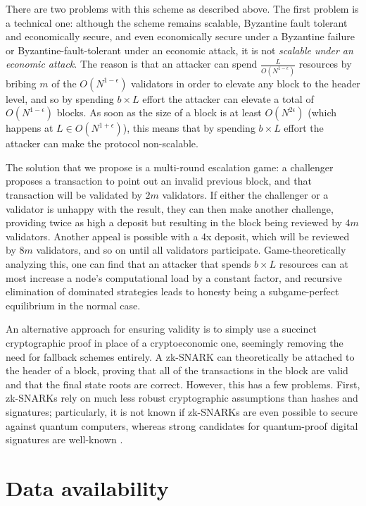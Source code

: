 \documentclass[11pt,a4paper]{report}
\theoremstyle{plain}
\theoremstyle{definition}
\theoremstyle{remark}
\begin{document}
There are two problems with this scheme as described above. The first problem is a technical one: although the scheme remains scalable, Byzantine fault tolerant and economically secure, and even economically secure under a Byzantine failure or Byzantine-fault-tolerant under an economic attack, it is not \emph{scalable under an economic attack}. The reason is that an attacker can spend $\frac{L}{O(N^{1-\epsilon})}$ resources by bribing $m$ of the $O(N^{1-\epsilon})$ validators in order to elevate any block to the header level, and so by spending $b \times  L$ effort the attacker can elevate a total of $O(N^{1-\epsilon})$ blocks. As soon as the size of a block is at least $O(N^{2\epsilon})$ (which happens at $L \in O(N^{1+\epsilon})$), this means that by spending $b \times  L$ effort the attacker can make the protocol non-scalable.

The solution that we propose is a multi-round escalation game: a challenger proposes a transaction to point out an invalid previous block, and that transaction will be validated by $2m$ validators. If either the challenger or a validator is unhappy with the result, they can then make another challenge, providing twice as high a deposit but resulting in the block being reviewed by $4m$ validators. Another appeal is possible with a 4x deposit, which will be reviewed by $8m$ validators, and so on until all validators participate. Game-theoretically analyzing this, one can find that an attacker that spends $b \times  L$ resources can at most increase a node's computational load by a constant factor, and recursive elimination of dominated strategies leads to honesty being a subgame-perfect equilibrium in the normal case.

An alternative approach for ensuring validity is to simply use a succinct cryptographic proof in place of a cryptoeconomic one, seemingly removing the need for fallback schemes entirely. A zk-SNARK can theoretically be attached to the header of a block, proving that all of the transactions in the block are valid and that the final state roots are correct. However, this has a few problems. First, zk-SNARKs rely on much less robust cryptographic assumptions than hashes and signatures; particularly, it is not known if zk-SNARKs are even possible to secure against quantum computers, whereas strong candidates for quantum-proof digital signatures are well-known \citep{bernstein_sphincs:_2014, gluck_hash_2014, hoffstein_ntrusign:_2003}.

\chapter{Data availability}
\end{document}
